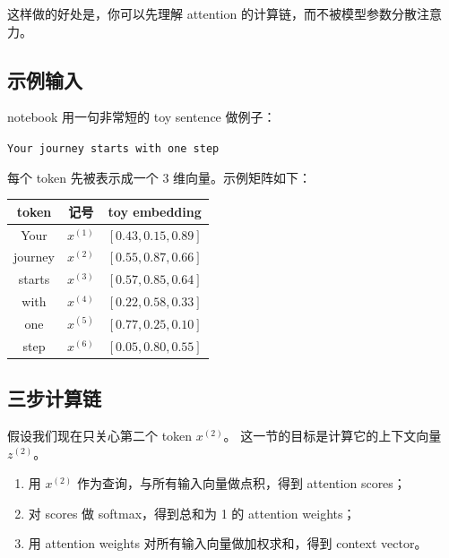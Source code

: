 \documentclass[12pt,a4paper]{ctexart}
\begin{document}
这样做的好处是，你可以先理解 attention 的计算链，而不被模型参数分散注意力。

\subsection{示例输入}

notebook 用一句非常短的 toy sentence 做例子：

\begin{center}
\texttt{Your journey starts with one step}
\end{center}

每个 token 先被表示成一个 3 维向量。示例矩阵如下：

\begin{center}
\begin{tabular}{c c c}
\toprule
token & 记号 & toy embedding \\
\midrule
Your & \(x^{(1)}\) & \([0.43, 0.15, 0.89]\) \\
journey & \(x^{(2)}\) & \([0.55, 0.87, 0.66]\) \\
starts & \(x^{(3)}\) & \([0.57, 0.85, 0.64]\) \\
with & \(x^{(4)}\) & \([0.22, 0.58, 0.33]\) \\
one & \(x^{(5)}\) & \([0.77, 0.25, 0.10]\) \\
step & \(x^{(6)}\) & \([0.05, 0.80, 0.55]\) \\
\bottomrule
\end{tabular}
\end{center}

\subsection{三步计算链}

假设我们现在只关心第二个 token \(x^{(2)}\)。
这一节的目标是计算它的上下文向量 \(z^{(2)}\)。

\begin{enumerate}
  \item 用 \(x^{(2)}\) 作为查询，与所有输入向量做点积，得到 attention scores；
  \item 对 scores 做 softmax，得到总和为 1 的 attention weights；
  \item 用 attention weights 对所有输入向量做加权求和，得到 context vector。
\end{enumerate}
\end{document}
